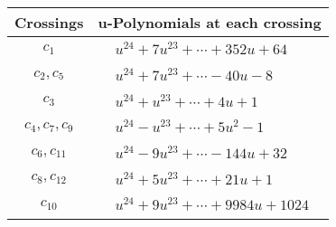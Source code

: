 \documentclass[1p]{elsarticle_modified}
\theoremstyle{definition}
\begin{document}
\begin{tabular}{m{50pt}|m{274pt}}
Crossings & \hspace{64pt}u-Polynomials at each crossing \\
\hline $$\begin{aligned}c_{1}\end{aligned}$$&$\begin{aligned}
&u^{24}+7 u^{23}+\cdots+352 u+64
\end{aligned}$\\
\hline $$\begin{aligned}c_{2},c_{5}\end{aligned}$$&$\begin{aligned}
&u^{24}+7 u^{23}+\cdots-40 u-8
\end{aligned}$\\
\hline $$\begin{aligned}c_{3}\end{aligned}$$&$\begin{aligned}
&u^{24}+u^{23}+\cdots+4 u+1
\end{aligned}$\\
\hline $$\begin{aligned}c_{4},c_{7},c_{9}\end{aligned}$$&$\begin{aligned}
&u^{24}- u^{23}+\cdots+5 u^2-1
\end{aligned}$\\
\hline $$\begin{aligned}c_{6},c_{11}\end{aligned}$$&$\begin{aligned}
&u^{24}-9 u^{23}+\cdots-144 u+32
\end{aligned}$\\
\hline $$\begin{aligned}c_{8},c_{12}\end{aligned}$$&$\begin{aligned}
&u^{24}+5 u^{23}+\cdots+21 u+1
\end{aligned}$\\
\hline $$\begin{aligned}c_{10}\end{aligned}$$&$\begin{aligned}
&u^{24}+9 u^{23}+\cdots+9984 u+1024
\end{aligned}$\\
\hline
\end{tabular}\\~\\
\newpage\renewcommand{\arraystretch}{1}
\end{document}
